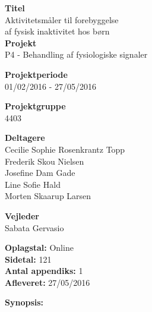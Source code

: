 \begin{minipage}[t]{0.48\textwidth}
\textbf{Titel} \\[5pt]\hspace*{2ex} 
Aktivitetsmåler til forebyggelse\\\hspace*{2ex}
af fysisk inaktivitet hos børn\\


\textbf{Projekt} \\[5pt]\hspace*{2ex} 
P4 - Behandling af fysiologiske signaler\\\hspace*{2ex}


\textbf{Projektperiode} \\[5pt]\bigskip\hspace{2ex}
01/02/2016 - 27/05/2016

\textbf{Projektgruppe} \\[5pt]\bigskip\hspace{2ex}
4403

\textbf{Deltagere} \\[5pt]\hspace*{2ex}
Cecilie Sophie Rosenkrantz Topp \\\hspace*{2ex}
Frederik Skou Nielsen \\\hspace*{2ex}
Josefine Dam Gade \\\hspace*{2ex}
Line Sofie Hald \\\hspace*{2ex}
Morten Skaarup Larsen \\\bigskip\hspace{2ex}


\textbf{Vejleder} \\[5pt]\hspace*{2ex}
Sabata Gervasio \\\bigskip\hspace{2ex}


\vspace*{1cm}

\textbf{Oplagstal:} Online \\
\textbf{Sidetal:} 121 \\
\textbf{Antal appendiks:} 1 \\ 
\textbf{Afleveret:} 27/05/2016

\end{minipage}
\hfill
\begin{minipage}[t]{0.483\textwidth}
\textbf{Synopsis:} \\[5pt]
\fbox{\parbox{7.5cm}{\bigskip\bigskip}}
\end{minipage}

